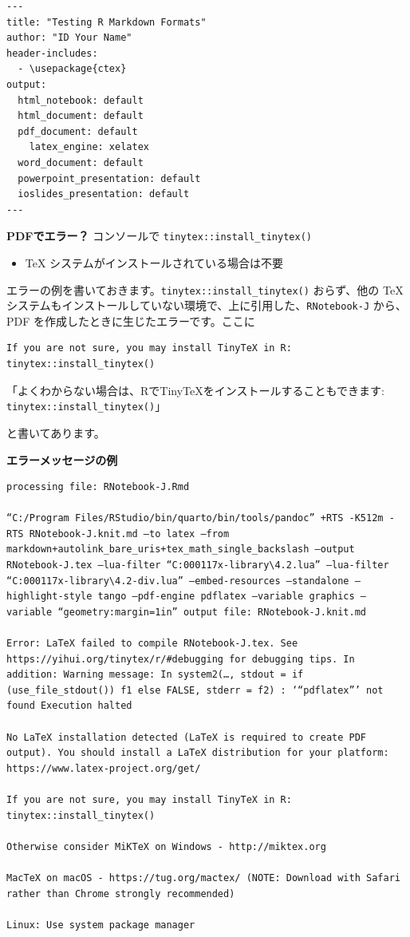 \documentclass[
]{bxjsbook}
\providecommand{\tightlist}{%
  \setlength{\itemsep}{0pt}\setlength{\parskip}{0pt}}
\theoremstyle{definition}
\theoremstyle{definition}
\theoremstyle{definition}
\theoremstyle{definition}
\theoremstyle{remark}
\begin{document}
\begin{verbatim}
---
title: "Testing R Markdown Formats"
author: "ID Your Name"
header-includes:
  - \usepackage{ctex}
output:
  html_notebook: default
  html_document: default
  pdf_document: default
    latex_engine: xelatex
  word_document: default
  powerpoint_presentation: default
  ioslides_presentation: default
---
\end{verbatim}

\textbf{PDFでエラー？} コンソールで \texttt{tinytex::install\_tinytex()}

\begin{itemize}
\tightlist
\item
  TeX システムがインストールされている場合は不要
\end{itemize}

エラーの例を書いておきます。\texttt{tinytex::install\_tinytex()} おらず、他の TeX システムもインストールしていない環境で、上に引用した、\texttt{RNotebook-J} から、PDF を作成したときに生じたエラーです。ここに

\begin{verbatim}
If you are not sure, you may install TinyTeX in R: tinytex::install_tinytex()
\end{verbatim}

「よくわからない場合は、RでTinyTeXをインストールすることもできます: \texttt{tinytex::install\_tinytex()}」

と書いてあります。

\textbf{エラーメッセージの例}

\begin{verbatim}
processing file: RNotebook-J.Rmd

“C:/Program Files/RStudio/bin/quarto/bin/tools/pandoc” +RTS -K512m -RTS RNotebook-J.knit.md –to latex –from markdown+autolink_bare_uris+tex_math_single_backslash –output RNotebook-J.tex –lua-filter “C:000117x-library\4.2.lua” –lua-filter “C:000117x-library\4.2-div.lua” –embed-resources –standalone –highlight-style tango –pdf-engine pdflatex –variable graphics –variable “geometry:margin=1in” output file: RNotebook-J.knit.md

Error: LaTeX failed to compile RNotebook-J.tex. See https://yihui.org/tinytex/r/#debugging for debugging tips. In addition: Warning message: In system2(…, stdout = if (use_file_stdout()) f1 else FALSE, stderr = f2) : ‘“pdflatex”’ not found Execution halted

No LaTeX installation detected (LaTeX is required to create PDF output). You should install a LaTeX distribution for your platform: https://www.latex-project.org/get/

If you are not sure, you may install TinyTeX in R: tinytex::install_tinytex()

Otherwise consider MiKTeX on Windows - http://miktex.org

MacTeX on macOS - https://tug.org/mactex/ (NOTE: Download with Safari rather than Chrome strongly recommended)

Linux: Use system package manager
\end{verbatim}
\end{document}
